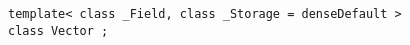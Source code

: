 {
	\small
\begin{lstlisting}
template< class _Field, class _Storage = denseDefault >
class Vector ;
\end{lstlisting}
}
